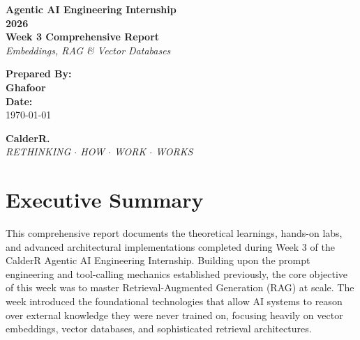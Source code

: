 \documentclass[12pt, a4paper]{article}
\begin{document}
\begin{titlepage}
    \centering
    \vspace*{2cm}
    
    {\Huge \textbf{\textcolor{primary}{Agentic AI Engineering Internship}}} \\[0.5cm]
    {\Huge \textbf{\textcolor{primary}{2026}}} \\[1.5cm]
    
    {\LARGE \textbf{Week 3 Comprehensive Report}} \\[0.5cm]
    {\Large \textit{Embeddings, RAG \& Vector Databases}} \\[2cm]
    
    \begin{tcolorbox}[colback=accent, colframe=primary, rounded corners, boxrule=1.5pt, width=0.75\textwidth, arc=4mm]
        \centering
        \vspace{0.4cm}
        {\Large \textbf{Prepared By:}} \\[0.2cm]
        {\Large \textbf{Ghafoor}} \\[0.4cm]
        {\large \textbf{Date:}} \\
        {\large \today}
        \vspace{0.4cm}
    \end{tcolorbox}
    
    \vfill
    
    {\huge \textbf{\textcolor{secondary}{CalderR.}}} \\[0.2cm]
    {\large \textit{RETHINKING $\cdot$ HOW $\cdot$ WORK $\cdot$ WORKS}}
    \vspace*{1cm}
\end{titlepage}

\tableofcontents
\newpage

\section{Executive Summary}
This comprehensive report documents the theoretical learnings, hands-on labs, and advanced architectural implementations completed during Week 3 of the CalderR Agentic AI Engineering Internship. Building upon the prompt engineering and tool-calling mechanics established previously, the core objective of this week was to master Retrieval-Augmented Generation (RAG) at scale. The week introduced the foundational technologies that allow AI systems to reason over external knowledge they were never trained on, focusing heavily on vector embeddings, vector databases, and sophisticated retrieval architectures.
\end{document}
